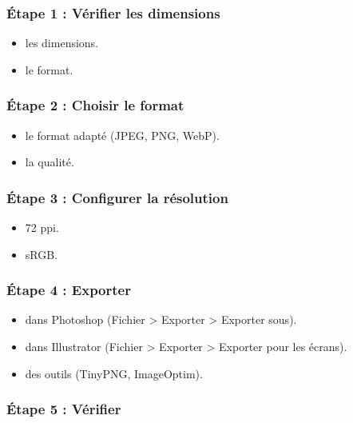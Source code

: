 \subsubsection{Étape 1 : Vérifier les dimensions}

\begin{itemize}
    \item {} les dimensions.
    \item {} le format.
\end{itemize}

\subsubsection{Étape 2 : Choisir le format}

\begin{itemize}
    \item {} le format adapté (JPEG, PNG, WebP).
    \item {} la qualité.
\end{itemize}

\subsubsection{Étape 3 : Configurer la résolution}

\begin{itemize}
    \item {} 72 ppi.
    \item {} sRGB.
\end{itemize}

\subsubsection{Étape 4 : Exporter}

\begin{itemize}
    \item {} dans Photoshop (Fichier > Exporter > Exporter sous).
    \item {} dans Illustrator (Fichier > Exporter > Exporter pour les écrans).
    \item {} des outils (TinyPNG, ImageOptim).
\end{itemize}

\subsubsection{Étape 5 : Vérifier}

